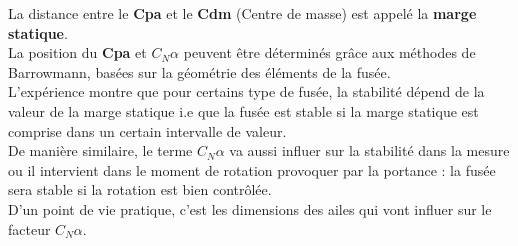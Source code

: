 \documentclass[a4paper]{article}
\begin{document}
La distance entre le \textbf{Cpa} et le \textbf{Cdm} (Centre de masse) est appelé la \textbf{marge statique}.\\
La position du \textbf{Cpa} et \textbf{$C_{N}\alpha$} peuvent être déterminés grâce aux méthodes de Barrowmann, basées sur la géométrie des éléments de la fusée.\\
L'expérience montre que pour certains type de fusée, la stabilité dépend de la valeur de la marge statique i.e que la fusée est stable si la marge statique est  comprise dans un certain intervalle de valeur.\\
De manière similaire, le terme \textbf{$C_{N}\alpha$} va aussi influer sur la stabilité dans la mesure ou il intervient dans le moment de rotation provoquer par la portance : la fusée sera stable si la rotation est bien contrôlée.\\
D'un point de vie pratique, c'est les dimensions des ailes qui vont influer sur le facteur  \textbf{$C_{N}\alpha$}.
\end{document}
